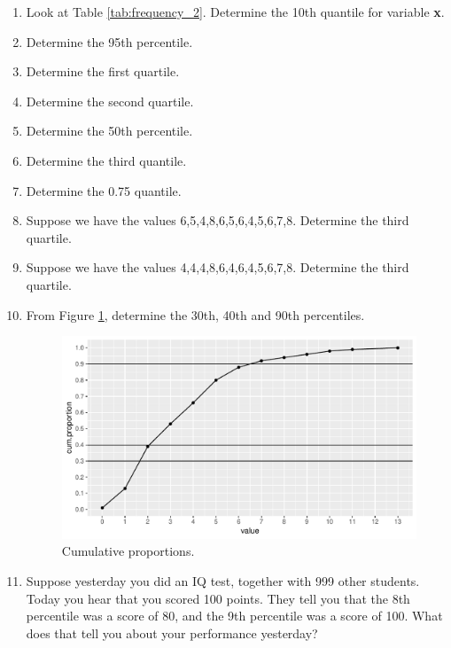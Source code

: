 \documentclass[]{book}\usepackage[]{graphicx}\usepackage[]{color}
\makeatletter
\def\maxwidth{ %
  \ifdim\Gin@nat@width>\linewidth
    \linewidth
  \else
    \Gin@nat@width
  \fi
}
\makeatother
\begin{document}
\begin{enumerate}
\item Look at Table \ref{tab:frequency_2}. Determine the 10th quantile for variable \textbf{x}.

\item Determine the 95th percentile.

\item Determine the first quartile.

\item Determine the second quartile.

\item Determine the 50th percentile.

\item Determine the third quantile.

\item Determine the 0.75 quantile.

\item Suppose we have the values {6,5,4,8,6,5,6,4,5,6,7,8}. Determine the third quartile.

\item Suppose we have the values {4,4,4,8,6,4,6,4,5,6,7,8}. Determine the third quartile.

\item From Figure \ref{fig:quartile_3}, determine the 30th, 40th and 90th percentiles.

\begin{figure}

{\centering \includegraphics[width=\maxwidth]{figure/quartile_3-1} 

}

\caption[Cumulative proportions]{Cumulative proportions.}\label{fig:quartile_3}
\end{figure}



\item Suppose yesterday you did an IQ test, together with 999 other students. Today you hear that you scored 100 points. They tell you that the 8th percentile was a score of 80, and the 9th percentile was a score of 100. What does that tell you about your performance yesterday?


\end{enumerate}
\end{document}
